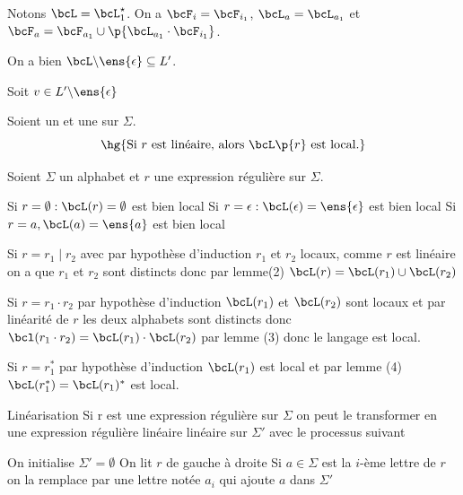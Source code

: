 \begin{nproof}
\begin{psse}
\begin{enumerate}
            \end{enumerate}     
            
            \item Notons $\bcL = \bcL_1^\star$. On a $\bcF_i = \bcF_{i_1}$, $\bcL_a = \bcL_{a_1}$ et $\bcF_a = \bcF_{a_1} \cup \p{\bcL_{a_1} \cdot \bcF_{i_1}}$.
                
            On a bien $\bcL \backslash \ens{\epsilon} \subseteq L'$.
                
                Soit $v \in L' \backslash \ens{\epsilon} $

        \end{psse}
    \end{nproof}
    
    
    \begin{property}{}{}
        Soient \hg{$\Sigma$} un  et  une  sur $\Sigma$.
        \[ \hg{\text{Si} \ r \ \text{est linéaire, alors} \ \bcL\p{r} \ \text{est local.}} \]
    \end{property}
    
    \begin{nproof}
        Soient $\Sigma$ un alphabet et $r$ une expression régulière sur $\Sigma$.
        \begin{enumerate}
            \itt Si \(r = \emptyset : \bcL(r) = \emptyset\) est bien local
            \itt Si \(r= \epsilon : \bcL(\epsilon) = \ens{\epsilon}\) est bien local
            \itt Si \(r=a, \bcL(a) = \ens{a}\) est bien local

            \itt Si \(r = r_1 \mid r_2\) avec par hypothèse d'induction \(r_1\) et \(r_2\) locaux, comme \(r\) est linéaire on a que \(r_1\) et \(r_2\) sont distincts donc par lemme(2) \(\bcL(r) = \bcL(r_1)\cup\bcL(r_2)\)

            \itt Si \(r = r_1 \cdot r_2\) par hypothèse d'induction \(\bcL(r_1)\) et \(\bcL(r_2)\) sont locaux et par linéarité de \(r\) les deux alphabets sont distincts donc \(\bcl(r_1\cdot r_2) = \bcL(r_1) \cdot \bcL(r_2)\) par lemme (3) donc le langage est local.

            \itt Si \(r = r_1^*\) par hypothèse d'induction \(\bcL(r_1)\) est local et par lemme (4) \(\bcL(r_1^*) = \bcL(r_1)^*\) est local.
        \end{enumerate}
    \end{nproof}
    
    \begin{definition}{Linéarisation}
        Si r est une expression régulière sur $\Sigma$ on peut le transformer en une 
        expression régulière linéaire linéaire sur $\Sigma'$ avec le processus suivant
        \begin{enumerate}
            \itast On initialise \(\Sigma' = \emptyset\)
            \itast On lit \(r\) de gauche à droite 
            \itast Si \(a\in\Sigma\) est la \(i\)-ème lettre de \(r\) on la remplace par une lettre notée \(a_i\) qui ajoute \(a\) dans \(\Sigma'\)
        \end{enumerate}
    \end{definition}
    
